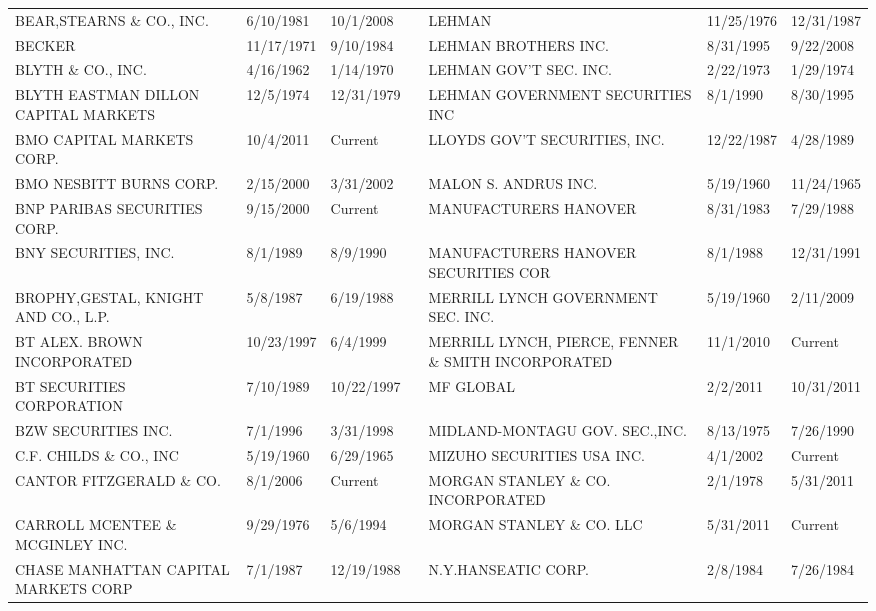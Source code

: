 \documentclass{article}
\begin{document}
\begin{tabular}{lllllll}
BEAR,STEARNS \& CO., INC.            & 6/10/1981 & 10/1/2008 &  & LEHMAN                               & 11/25/1976 & 12/31/1987 \\
BECKER                               & 11/17/1971 & 9/10/1984 &  & LEHMAN BROTHERS INC.                 & 8/31/1995 & 9/22/2008 \\
BLYTH \& CO., INC.                    & 4/16/1962 & 1/14/1970 &  & LEHMAN GOV'T SEC. INC.               & 2/22/1973 & 1/29/1974 \\
BLYTH EASTMAN DILLON CAPITAL MARKETS & 12/5/1974 & 12/31/1979 &  & LEHMAN GOVERNMENT SECURITIES INC     & 8/1/1990 & 8/30/1995 \\
BMO CAPITAL MARKETS CORP.  & 10/4/2011 & Current &  & LLOYDS GOV'T SECURITIES, INC.       & 12/22/1987 & 4/28/1989 \\
BMO NESBITT BURNS CORP.             & 2/15/2000 & 3/31/2002 &  & MALON S. ANDRUS INC.                 & 5/19/1960 & 11/24/1965 \\
BNP PARIBAS SECURITIES CORP.         & 9/15/2000 & Current &  & MANUFACTURERS HANOVER                & 8/31/1983 & 7/29/1988 \\
BNY SECURITIES, INC.                 & 8/1/1989 & 8/9/1990 &  & MANUFACTURERS HANOVER SECURITIES COR & 8/1/1988 & 12/31/1991 \\
BROPHY,GESTAL, KNIGHT AND CO., L.P. & 5/8/1987 & 6/19/1988 &  & MERRILL LYNCH GOVERNMENT SEC. INC.  & 5/19/1960 & 2/11/2009 \\
BT ALEX. BROWN INCORPORATED          & 10/23/1997 & 6/4/1999 &  & MERRILL LYNCH, PIERCE, FENNER \& SMITH INCORPORATED & 11/1/2010 & Current \\
BT SECURITIES CORPORATION            & 7/10/1989 & 10/22/1997 &  & MF GLOBAL  & 2/2/2011 & 10/31/2011 \\
BZW SECURITIES INC.                  & 7/1/1996 & 3/31/1998 &  & MIDLAND-MONTAGU GOV. SEC.,INC.  & 8/13/1975 & 7/26/1990 \\
C.F. CHILDS \& CO., INC               & 5/19/1960 & 6/29/1965 &  & MIZUHO SECURITIES USA INC.          & 4/1/2002 & Current \\
CANTOR FITZGERALD \& CO. & 8/1/2006 & Current &  & MORGAN STANLEY \& CO. INCORPORATED   & 2/1/1978 & 5/31/2011 \\
CARROLL MCENTEE \& MCGINLEY INC.      & 9/29/1976 & 5/6/1994 &  & MORGAN STANLEY \& CO. LLC & 5/31/2011 & Current \\
CHASE MANHATTAN CAPITAL MARKETS CORP & 7/1/1987 & 12/19/1988 &  & N.Y.HANSEATIC CORP.             & 2/8/1984 & 7/26/1984 \\

\end{tabular}
\end{document}
